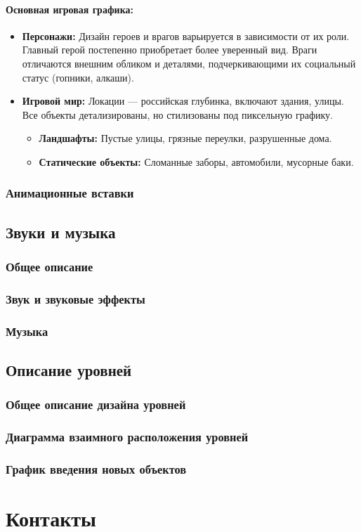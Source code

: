 \documentclass[12pt]{article}
\begin{document}
        \paragraph{Основная игровая графика:} 
            \begin{itemize}
                \item \textbf{Персонажи:} Дизайн героев и врагов варьируется в зависимости от их роли. Главный герой постепенно приобретает более уверенный вид. Враги отличаются внешним обликом и деталями, подчеркивающими их социальный статус (гопники, алкаши).
                \item \textbf{Игровой мир:} Локации — российская глубинка, включают здания, улицы. Все объекты детализированы, но стилизованы под пиксельную графику.
            \begin{itemize}
                \item \textbf{Ландшафты:} Пустые улицы, грязные переулки, разрушенные дома.
                \item \textbf{Статические объекты:} Сломанные заборы, автомобили, мусорные баки.
            \end{itemize}
            \end{itemize}

        \subsubsection{Анимационные вставки}
    \subsection{Звуки и музыка}
        \subsubsection{Общее описание}
        \subsubsection{Звук и звуковые эффекты}
        \subsubsection{Музыка}
    \subsection{Описание уровней}
        \subsubsection{Общее описание дизайна уровней}
        \subsubsection{Диаграмма взаимного расположения уровней}
        \subsubsection{График введения новых объектов}

\section{Контакты}

\newpage
\end{document}
